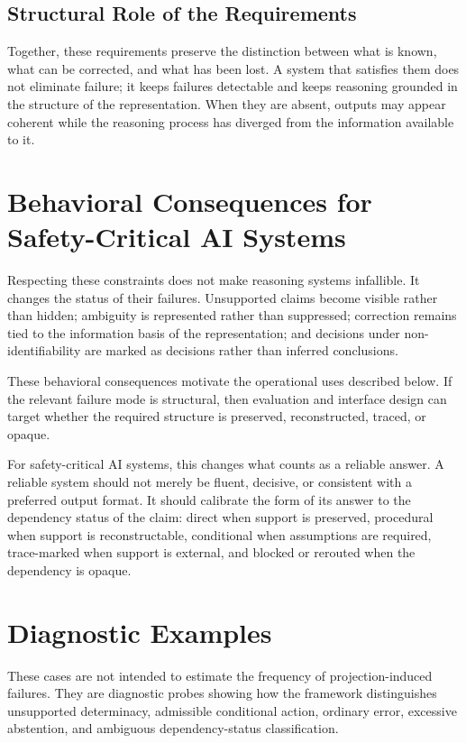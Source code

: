 \documentclass[11pt]{article}
\begin{document}
\subsection{Structural Role of the Requirements}

Together, these requirements preserve the distinction between what is known, what can be corrected, and what has been lost. A system that satisfies them does not eliminate failure; it keeps failures detectable and keeps reasoning grounded in the structure of the representation. When they are absent, outputs may appear coherent while the reasoning process has diverged from the information available to it.

\section{Behavioral Consequences for Safety-Critical AI Systems}

Respecting these constraints does not make reasoning systems infallible. It changes the status of their failures. Unsupported claims become visible rather than hidden; ambiguity is represented rather than suppressed; correction remains tied to the information basis of the representation; and decisions under non-identifiability are marked as decisions rather than inferred conclusions.

These behavioral consequences motivate the operational uses described below. If the relevant failure mode is structural, then evaluation and interface design can target whether the required structure is preserved, reconstructed, traced, or opaque.

For safety-critical AI systems, this changes what counts as a reliable answer. A reliable system should not merely be fluent, decisive, or consistent with a preferred output format. It should calibrate the form of its answer to the dependency status of the claim: direct when support is preserved, procedural when support is reconstructable, conditional when assumptions are required, trace-marked when support is external, and blocked or rerouted when the dependency is opaque.

\section{Diagnostic Examples}

These cases are not intended to estimate the frequency of projection-induced failures. They are diagnostic probes showing how the framework distinguishes unsupported determinacy, admissible conditional action, ordinary error, excessive abstention, and ambiguous dependency-status classification.
\end{document}
